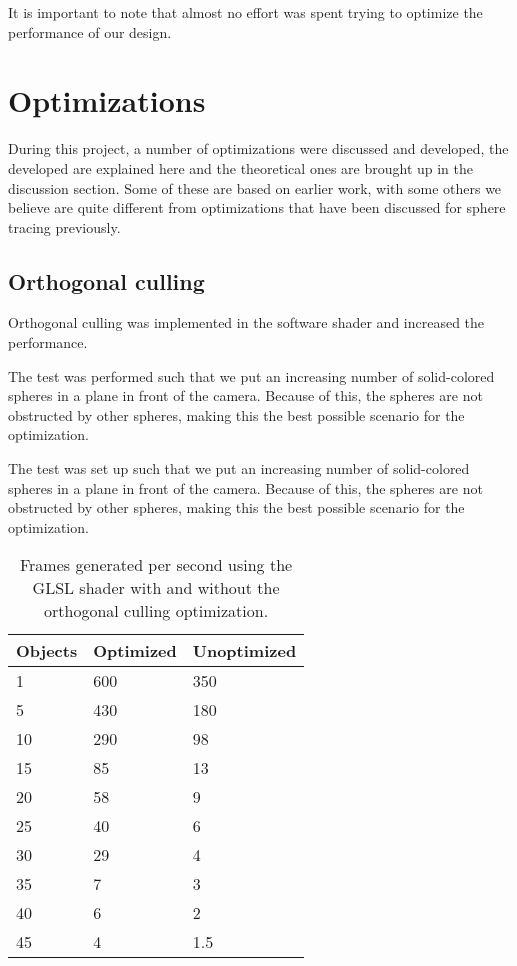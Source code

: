 		It is important to note that almost no effort was spent trying to
		optimize the performance of our design. 

	\section{Optimizations}
		
		During this project, a number of optimizations were discussed and
		developed, the developed are explained here and the theoretical ones
		are brought up in the discussion section. Some of these are based on
		earlier work, with some others we believe are quite different from
		optimizations that have been discussed for sphere tracing previously.

		\subsection{Orthogonal culling}

			Orthogonal culling was implemented in the software shader and
			increased the performance.

			The test was performed such that we put an increasing number of
			solid-colored spheres in a plane in front of the camera. Because of
			this, the spheres are not obstructed by other spheres, making this
			the best possible scenario for the optimization.

			The test was set up such that we put an increasing number of
			solid-colored spheres in a plane in front of the camera. Because of
			this, the spheres are not obstructed by other spheres, making this
			the best possible scenario for the optimization.

			\begin{table}
			\centering
			\begin{tabular}{lll}
				\hline
				Objects & Optimized & Unoptimized \\ 
				\hline
				1       & 600       & 350         \\ 
				5       & 430       & 180         \\			
				10      & 290       & 98          \\
				15      & 85        & 13          \\
				20      & 58        & 9           \\
				25      & 40        & 6           \\
				30      & 29        & 4           \\
				35      & 7         & 3           \\
				40      & 6         & 2           \\
				45      & 4         & 1.5         \\
				\hline
			\end{tabular}
			\caption{Frames generated per second using the GLSL shader with and
				without the orthogonal culling optimization.}
			\end{table}


